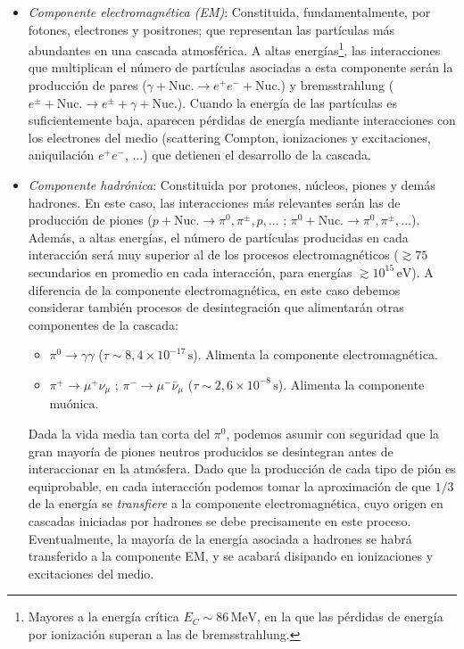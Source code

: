 \documentclass[12 pt, a4paper]{article} %
\numberwithin{equation}{section}
\numberwithin{figure}{section}
\numberwithin{table}{section}
\begin{document}
\begin{itemize}
	\item\textit{Componente electromagnética (EM)}: Constituida, fundamentalmente, por fotones, electrones y positrones; que representan las partículas más abundantes en una cascada atmosférica. A altas energías\footnote{ Mayores a la energía crítica $E_C\sim86\,\mathrm{MeV}$, en la que las pérdidas de energía por ionización superan a las de bremsstrahlung.}, las interacciones que multiplican el número de partículas asociadas a esta componente serán la producción de pares ($\gamma+\text{Nuc.}\rightarrow e^+e^-+\text{Nuc.}$) y bremsstrahlung ($e^\pm+\text{Nuc.}\rightarrow e^\pm+\gamma+\text{Nuc.}$). Cuando la energía de las partículas es suficientemente baja, aparecen pérdidas de energía mediante interacciones con los electrones del medio (scattering Compton, ionizaciones y excitaciones, aniquilación $e^+e^-$, ...) que detienen el desarrollo de la cascada.
	\item\textit{Componente hadrónica}: Constituida por protones, núcleos, piones y demás hadrones. En este caso, las interacciones más relevantes serán las de producción de piones ($p+\text{Nuc.}\rightarrow\pi^0,\pi^\pm,p,...$ ; $\pi^0+\text{Nuc.}\rightarrow \pi^0,\pi^\pm,...$). Además, a altas energías, el número de partículas producidas en cada interacción será muy superior al de los procesos electromagnéticos ($\gtrsim75$ secundarios en promedio en cada interacción, para energías $\gtrsim10^{15}\,\mathrm{eV}$). A diferencia de la componente electromagnética, en este caso debemos considerar también procesos de desintegración que alimentarán otras componentes de la cascada:
	\begin{itemize}
		\item $\pi^0\rightarrow\gamma\gamma$ ($\tau\sim8,4\times10^{-17}\,\mathrm{s}$). Alimenta la componente electromagnética.
		\item  $\pi^+\rightarrow\mu^+\nu_\mu$ ; $\pi^-\rightarrow\mu^-\bar\nu_\mu$ ($\tau\sim2,6\times10^{-8}\,\mathrm{s}$). Alimenta la componente muónica.
	\end{itemize}
Dada la vida media tan corta del $\pi^0$, podemos asumir con seguridad que la gran mayoría de piones neutros producidos se desintegran antes de interaccionar en la atmósfera. Dado que la producción de cada tipo de pión es equiprobable, en cada interacción podemos tomar la aproximación de que $1/3$ de la energía se \textit{transfiere} a la componente electromagnética, cuyo origen en cascadas iniciadas por hadrones se debe precisamente en este proceso. Eventualmente, la mayoría de la energía asociada a hadrones se habrá transferido a la componente EM, y se acabará disipando en ionizaciones y excitaciones del medio.


\end{itemize}
\end{document}

